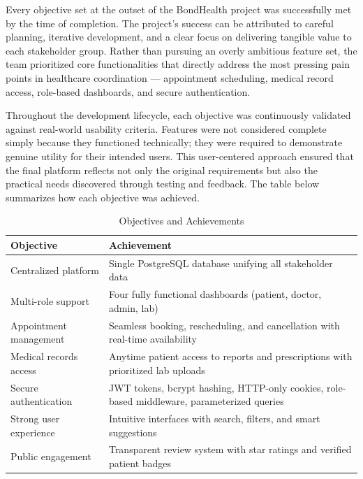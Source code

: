 \noindent Every objective set at the outset of the BondHealth project was successfully met by the time of completion. The project's success can be attributed to careful planning, iterative development, and a clear focus on delivering tangible value to each stakeholder group. Rather than pursuing an overly ambitious feature set, the team prioritized core functionalities that directly address the most pressing pain points in healthcare coordination --- appointment scheduling, medical record access, role-based dashboards, and secure authentication.

\noindent Throughout the development lifecycle, each objective was continuously validated against real-world usability criteria. Features were not considered complete simply because they functioned technically; they were required to demonstrate genuine utility for their intended users. This user-centered approach ensured that the final platform reflects not only the original requirements but also the practical needs discovered through testing and feedback. The table below summarizes how each objective was achieved.

\begin{table}[H]
\centering
\begin{tabular}{|l|p{10cm}|}
\hline
\textbf{Objective} & \textbf{Achievement} \\
\hline
Centralized platform & Single PostgreSQL database unifying all stakeholder data \\
\hline
Multi-role support & Four fully functional dashboards (patient, doctor, admin, lab) \\
\hline
Appointment management & Seamless booking, rescheduling, and cancellation with real-time availability \\
\hline
Medical records access & Anytime patient access to reports and prescriptions with prioritized lab uploads \\
\hline
Secure authentication & JWT tokens, bcrypt hashing, HTTP-only cookies, role-based middleware, parameterized queries \\
\hline
Strong user experience & Intuitive interfaces with search, filters, and smart suggestions \\
\hline
Public engagement & Transparent review system with star ratings and verified patient badges \\
\hline
\end{tabular}
\caption{Objectives and Achievements}
\label{tab:achievements}
\end{table}

